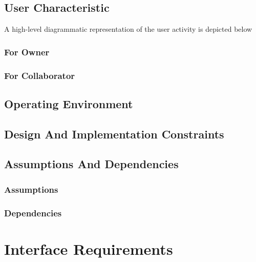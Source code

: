 \documentclass[12pt,a4paper]{report}
\begin{document}
\section{User Characteristic}
A high-level diagrammatic representation of the user activity is depicted below 
	\subsection{For Owner}
	\subsection{For Collaborator}
\section{Operating Environment}

\section{Design And Implementation Constraints}
\section{Assumptions And Dependencies}
	\subsection{Assumptions}
	\subsection{Dependencies}

\chapter{Interface Requirements}
\end{document}

